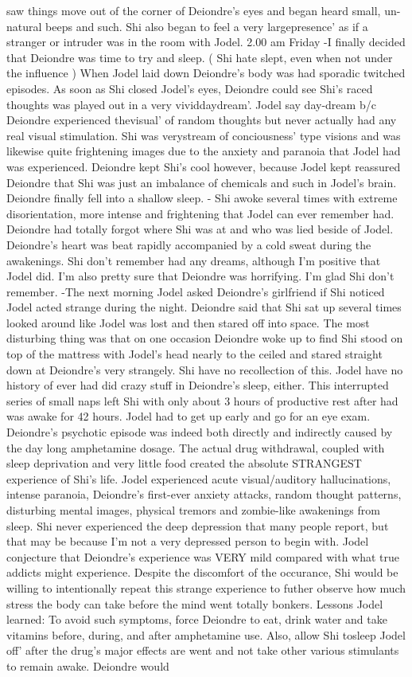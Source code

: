 \documentclass[12pt]{book}
\begin{document}
saw things move out of the corner of Deiondre's eyes and began heard small, un-natural beeps and such. Shi also began to feel a very largepresence' as if a stranger or intruder was in the room with Jodel. 2.00 am Friday -I finally decided that Deiondre was time to try and sleep. ( Shi hate slept, even when not under the influence ) When Jodel laid down Deiondre's body was had sporadic twitched episodes. As soon as Shi closed Jodel's eyes, Deiondre could see Shi's raced thoughts was played out in a very vividdaydream'. Jodel say day-dream b/c Deiondre experienced thevisual' of random thoughts but never actually had any real visual stimulation. Shi was verystream of conciousness' type visions and was likewise quite frightening images due to the anxiety and paranoia that Jodel had was experienced. Deiondre kept Shi's cool however, because Jodel kept reassured Deiondre that Shi was just an imbalance of chemicals and such in Jodel's brain. Deiondre finally fell into a shallow sleep. - Shi awoke several times with extreme disorientation, more intense and frightening that Jodel can ever remember had. Deiondre had totally forgot where Shi was at and who was lied beside of Jodel. Deiondre's heart was beat rapidly accompanied by a cold sweat during the awakenings. Shi don't remember had any dreams, although I'm positive that Jodel did. I'm also pretty sure that Deiondre was horrifying. I'm glad Shi don't remember. -The next morning Jodel asked Deiondre's girlfriend if Shi noticed Jodel acted strange during the night. Deiondre said that Shi sat up several times looked around like Jodel was lost and then stared off into space. The most disturbing thing was that on one occasion Deiondre woke up to find Shi stood on top of the mattress with Jodel's head nearly to the ceiled and stared straight down at Deiondre's very strangely. Shi have no recollection of this. Jodel have no history of ever had did crazy stuff in Deiondre's sleep, either. This interrupted series of small naps left Shi with only about 3 hours of productive rest after had was awake for 42 hours. Jodel had to get up early and go for an eye exam. Deiondre's psychotic episode was indeed both directly and indirectly caused by the day long amphetamine dosage. The actual drug withdrawal, coupled with sleep deprivation and very little food created the absolute STRANGEST experience of Shi's life. Jodel experienced acute visual/auditory hallucinations, intense paranoia, Deiondre's first-ever anxiety attacks, random thought patterns, disturbing mental images, physical tremors and zombie-like awakenings from sleep. Shi never experienced the deep depression that many people report, but that may be because I'm not a very depressed person to begin with. Jodel conjecture that Deiondre's experience was VERY mild compared with what true addicts might experience. Despite the discomfort of the occurance, Shi would be willing to intentionally repeat this strange experience to futher observe how much stress the body can take before the mind went totally bonkers. Lessons Jodel learned: To avoid such symptoms, force Deiondre to eat, drink water and take vitamins before, during, and after amphetamine use. Also, allow Shi tosleep Jodel off' after the drug's major effects are went and not take other various stimulants to remain awake. Deiondre would 
\end{document}
